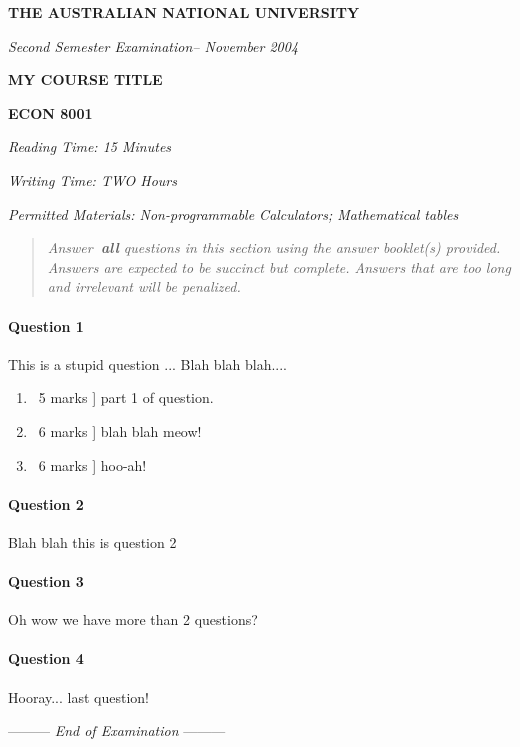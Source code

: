 \documentclass[a4paper,12pt,fleqn]{article}
\newcommand{\institution}{THE AUSTRALIAN NATIONAL UNIVERSITY}
\newcommand{\titlehd}{MY COURSE TITLE}
\newcommand{\examtype}{Second Semester Examination}
\newcommand{\examdate}{November 2004}
\newcommand{\examcode}{ECON 8001}
\newcommand{\readtime}{15 Minutes}
\newcommand{\writetime}{TWO Hours}
\newcommand{\materials}{Non-programmable Calculators; Mathematical tables}
\newcommand{\lastwords}{End of Examination}
\begin{document}

\begin{center}
\large\textbf{\institution}
\end{center}
\vspace{1cm}

\begin{center}
\textit{ \examtype -- \examdate}
\end{center}
\vspace{1cm}

\begin{center}
\large\textbf{\titlehd}
\end{center}

\begin{center}
\large\textbf{\examcode}
\end{center}
\vspace{4cm}

\begin{center}
\textit{Reading Time: \readtime}
\end{center}
\begin{center}
\textit{Writing Time:  \writetime}
\end{center}
\begin{center}
\textit{Permitted Materials: \materials}
\end{center}




\newpage
\begin{quote}
\textit{Answer\textbf{\ all} questions in this section using the answer
booklet(s) provided. Answers are expected to be succinct but complete.
Answers that are too long and irrelevant will be penalized.}
\end{quote}
\bigskip
\paragraph{\textbf{Question 1}}
This is a stupid question ... Blah blah blah....
\begin{enumerate}
\item \lbrack\ 5 marks ] part 1 of question.
\item \lbrack \ 6 marks ] blah blah meow!
\item \lbrack \ 6 marks ] hoo-ah!
\end{enumerate}


\newpage
\paragraph{\textbf{Question 2}}
Blah blah this is question 2

\newpage
\paragraph{\textbf{Question 3} \ }
Oh wow we have more than 2 questions? 

\newpage
\paragraph{Question 4} Hooray... last question!


\begin{center}
\vspace{3cm}
--------- \textit{\lastwords} ---------
\end{center}


\label{finalpage}
\end{document}
